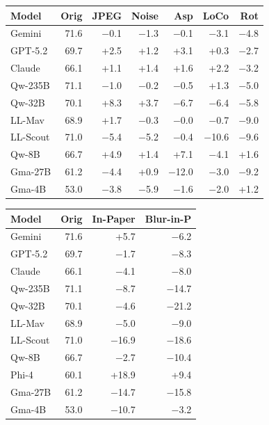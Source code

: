 \vspace{4pt}
\noindent
\begin{minipage}[t]{0.48\textwidth}
\footnotesize
{}\label{tab:transform-detail}
\setlength{\tabcolsep}{2pt}
\begin{tabular}{@{}l r rrrrr@{}}
\toprule
\textbf{Model} & \textbf{Orig} & \textbf{JPEG} & \textbf{Noise} & \textbf{Asp} & \textbf{LoCo} & \textbf{Rot} \\
\midrule
Gemini    & 71.6 & $-$0.1 & $-$1.3 & $-$0.1 & $-$3.1 & $-$4.8 \\
GPT-5.2   & 69.7 & +2.5 & +1.2 & +3.1 & +0.3 & $-$2.7 \\
Claude    & 66.1 & +1.1 & +1.4 & +1.6 & +2.2 & $-$3.2 \\
Qw-235B   & 71.1 & $-$1.0 & $-$0.2 & $-$0.5 & +1.3 & $-$5.0 \\
Qw-32B    & 70.1 & +8.3 & +3.7 & $-$6.7 & $-$6.4 & $-$5.8 \\
LL-Mav    & 68.9 & +1.7 & $-$0.3 & $-$0.0 & $-$0.7 & $-$9.0 \\
LL-Scout  & 71.0 & $-$5.4 & $-$5.2 & $-$0.4 & $-$10.6 & $-$9.6 \\
Qw-8B     & 66.7 & +4.9 & +1.4 & +7.1 & $-$4.1 & +1.6 \\
Gma-27B   & 61.2 & $-$4.4 & +0.9 & $-$12.0 & $-$3.0 & $-$9.2 \\
Gma-4B    & 53.0 & $-$3.8 & $-$5.9 & $-$1.6 & $-$2.0 & +1.2 \\
\bottomrule
\end{tabular}
\end{minipage}\hfill
\begin{minipage}[t]{0.48\textwidth}
\footnotesize
{}\label{tab:page-context}
\setlength{\tabcolsep}{2.5pt}
\begin{tabular}{@{}l r rr@{}}
\toprule
\textbf{Model} & \textbf{Orig} & \textbf{In-Paper} & \textbf{Blur-in-P} \\
\midrule
Gemini    & 71.6 & +5.7 & $-$6.2 \\
GPT-5.2   & 69.7 & $-$1.7 & $-$8.3 \\
Claude    & 66.1 & $-$4.1 & $-$8.0 \\
Qw-235B   & 71.1 & $-$8.7 & $-$14.7 \\
Qw-32B    & 70.1 & $-$4.6 & $-$21.2 \\
LL-Mav    & 68.9 & $-$5.0 & $-$9.0 \\
LL-Scout  & 71.0 & $-$16.9 & $-$18.6 \\
Qw-8B     & 66.7 & $-$2.7 & $-$10.4 \\
Phi-4     & 60.1 & +18.9 & +9.4 \\
Gma-27B   & 61.2 & $-$14.7 & $-$15.8 \\
Gma-4B    & 53.0 & $-$10.7 & $-$3.2 \\
\bottomrule
\end{tabular}
\end{minipage}


